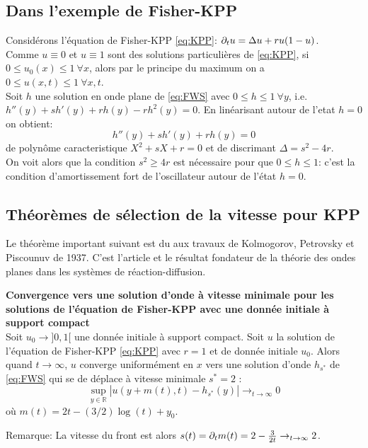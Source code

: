 \documentclass[11pt]{article}
\begin{document}
\subsection{Dans l'exemple de Fisher-KPP}
Considérons l'équation de Fisher-KPP \eqref{eq:KPP}: $\partial_t u = \Delta u + ru(1-u)$.\\
Comme $u \equiv 0$ et $u \equiv 1$ sont des solutions particulières de \eqref{eq:KPP}, si $0\leq u_0(x) \leq 1 \ \forall x$, alors par le principe du maximum on a $0\leq u(x,t) \leq 1 \ \forall x,t $.\\
Soit $h$ une solution en onde plane de \eqref{eq:FWS} avec $0\leq h \leq 1 \ \forall y$, i.e. $h''(y)+ sh'(y)+rh(y)-rh^2(y)=0$. 
En linéarisant autour de l'etat $h=0$ on obtient: \begin{equation}
 h''(y)+ sh'(y)+rh(y)=0
\end{equation}
de polynôme caracteristique $X^2+sX+r=0$ et de discrimant $\Delta = s^2 - 4r $.\\
On voit alors que la condition $s^2 \geq 4r$ est nécessaire pour que $0\leq h \leq 1 $: c'est la condition d'amortissement fort de l’oscillateur autour de l’état $h=0$.


\subsection{Théorèmes de sélection de la vitesse pour KPP}
Le théorème important suivant est du aux travaux de Kolmogorov, Petrovsky et Piscounuv de 1937. C'est l'article et le résultat fondateur de la théorie des ondes planes dans les systèmes de réaction-diffusion. %

\begin{theorem}{\textbf{Convergence vers une solution d'onde à vitesse minimale pour les solutions de l'équation de Fisher-KPP avec une donnée initiale à support compact }}\\
Soit $u_0 \to ]0,1[$ une donnée initiale à support compact. 
Soit $u$ la solution de l'équation de Fisher-KPP \eqref{eq:KPP} avec $r=1$ et de donnée initiale $u_0$.
Alors quand $t \to \infty$, $u$ converge uniformément en $x$ vers une solution d'onde $h_{s^*}$ de \eqref{eq:FWS} qui se de déplace à vitesse minimale $s^* =2$ :
\begin{equation*}
\sup_{y \in \mathbb{R}}  |u(y+m(t),t)-h_{s^*}(y)| \to_{t\to \infty} 0
\end{equation*}
où $m(t)= 2t - (3/2)\log (t) + y_0 $.
\end{theorem}
Remarque: La vitesse du front est alors $s(t) = \partial_t m(t) = 2 - \frac{3}{2t} \to_{t\to \infty} 2 $.
\end{document}
